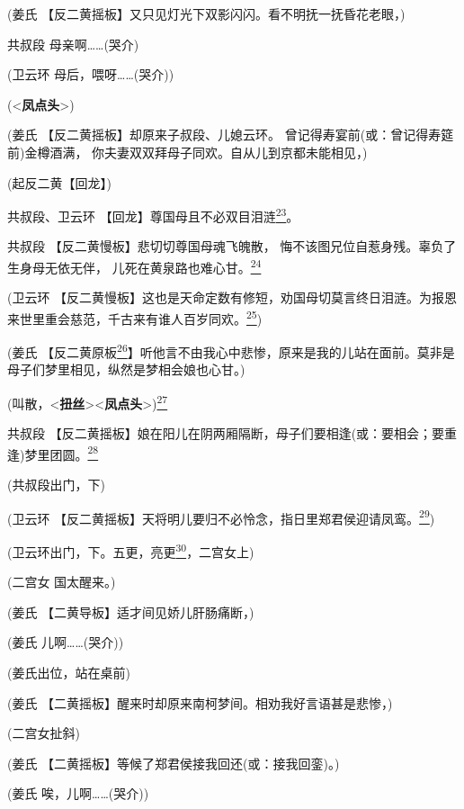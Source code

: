 (姜氏 【反二黄摇板】又只见灯光下双影闪闪。看不明抚一抚昏花老眼，)

共叔段 母亲啊\ldots{}\ldots{}(哭介)

(卫云环 母后，喂呀\ldots{}\ldots{}(哭介))

(\textless{}\textbf{凤点头}\textgreater{})

(姜氏 【反二黄摇板】却原来子叔段、儿媳云环。
曾记得寿宴前(或：曾记得寿筵前)金樽酒满，
你夫妻双双拜母子同欢。自从儿到京都未能相见，)

(起反二黄【回龙】)

共叔段、卫云环
【回龙】尊国母且不必双目泪涟\protect\hyperlink{fn23}{\textsuperscript{23}}。

共叔段 【反二黄慢板】悲切切尊国母魂飞魄散，
悔不该图兄位自惹身残。辜负了生身母无依无伴，
儿死在黄泉路也难心甘。\protect\hyperlink{fn24}{\textsuperscript{24}}

(卫云环
【反二黄慢板】这也是天命定数有修短，劝国母切莫言终日泪涟。为报恩来世里重会慈范，千古来有谁人百岁同欢。\protect\hyperlink{fn25}{\textsuperscript{25}})

(姜氏
【反二黄原板\protect\hyperlink{fn26}{\textsuperscript{26}}】听他言不由我心中悲惨，原来是我的儿站在面前。莫非是母子们梦里相见，纵然是梦相会娘也心甘。)

(叫散，\textless{}\textbf{扭丝}\textgreater{}\textless{}\textbf{凤点头}\textgreater{})\protect\hyperlink{fn27}{\textsuperscript{27}}

共叔段
【反二黄摇板】娘在阳儿在阴两厢隔断，母子们要相逢(或：要相会；要重逢)梦里团圆。\protect\hyperlink{fn28}{\textsuperscript{28}}

(共叔段出门，下)

(卫云环
【反二黄摇板】天将明儿要归不必怜念，指日里郑君侯迎请凤鸾。\protect\hyperlink{fn29}{\textsuperscript{29}})

(卫云环出门，下。五更，亮更\protect\hyperlink{fn30}{\textsuperscript{30}}，二宫女上)

(二宫女 国太醒来。)

(姜氏 【二黄导板】适才间见娇儿肝肠痛断，)

(姜氏 儿啊\ldots{}\ldots{}(哭介))

(姜氏出位，站在桌前)

(姜氏 【二黄摇板】醒来时却原来南柯梦间。相劝我好言语甚是悲惨，)

(二宫女扯斜)

(姜氏 【二黄摇板】等候了郑君侯接我回还(或：接我回銮)。)

(姜氏 唉，儿啊\ldots{}\ldots{}(哭介))

